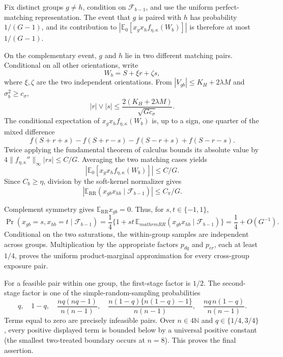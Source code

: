 Fix distinct groups \(g\neq h\), condition on \(\mathcal F_{b-1}\), and use the uniform perfect-matching representation.  The event that \(g\) is paired with \(h\) has probability \(1/(G-1)\), and its contribution to \(|\mathbb E_0[x_gx_hf_{\eta,\kappa}(W_b)]|\) is therefore at most \(1/(G-1)\).

On the complementary event, \(g\) and \(h\) lie in two different matching pairs.  Conditional on all other orientations, write
\[
 W_b=S+\xi r+\zeta s,
\]
where \(\xi,\zeta\) are the two independent orientations.  From \(|V_{gb}|\leq K_H+2\lambda M\) and \(\sigma_b^2\geq c_\sigma\),
\[
 |r|\vee|s|\leq\frac{2(K_H+2\lambda M)}{\sqrt{Gc_\sigma}}.
\]
The conditional expectation of \(x_gx_hf_{\eta,\kappa}(W_b)\) is, up to a sign, one quarter of the mixed difference
\[
 f(S+r+s)-f(S+r-s)-f(S-r+s)+f(S-r-s).
\]
Twice applying the fundamental theorem of calculus bounds its absolute value by
\(4\|f_{\eta,\kappa}''\|_\infty|rs|\leq C/G\).  Averaging the two matching cases yields
\[
 |\mathbb E_0[x_gx_hf_{\eta,\kappa}(W_b)]|\leq C/G.
\]
Since \(C_b\geq\eta\), division by the soft-kernel normalizer gives
\[
 |\mathbb E_{\mathrm{RR}}(x_{gb}x_{hb}\mid\mathcal F_{b-1})|
 \leq C_\pi/G.
\]

Complement symmetry gives \(\mathbb E_{\mathrm{RR}}x_{gb}=0\).  Thus, for \(s,t\in\{-1,1\}\),
\[
 \Pr(x_{gb}=s,x_{hb}=t\mid\mathcal F_{b-1})
 =\frac14\{1+st\,\mathbb E_{mathrm{RR}}(x_{gb}x_{hb}\mid\mathcal F_{b-1})\}
 =\frac14+O(G^{-1}).
\]
Conditional on the two saturations, the within-group samples are independent across groups.  Multiplication by the appropriate factors \(p_{dq}\) and \(p_{er}\), each at least \(1/4\), proves the uniform product-marginal approximation for every cross-group exposure pair.

For a feasible pair within one group, the first-stage factor is \(1/2\).  The second-stage factor is one of the simple-random-sampling probabilities
\[
 q,\quad 1-q,\quad
 \frac{nq(nq-1)}{n(n-1)},\quad
 \frac{n(1-q)\{n(1-q)-1\}}{n(n-1)},\quad
 \frac{nq\,n(1-q)}{n(n-1)}.
\]
Terms equal to zero are precisely infeasible pairs.  Over \(n\in4\mathbb N\) and \(q\in\{1/4,3/4\}\), every positive displayed term is bounded below by a universal positive constant (the smallest two-treated boundary occurs at \(n=8\)).  This proves the final assertion.